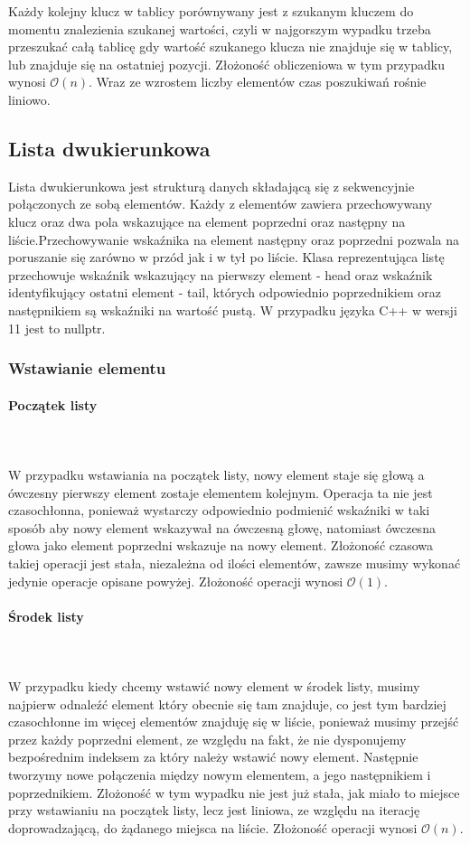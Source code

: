 \documentclass{article}
\newcommand{\myparagraph}[1]{\paragraph{#1}\mbox{}\\\\}
\begin{document}
Każdy kolejny klucz w tablicy porównywany jest z szukanym kluczem do momentu znalezienia szukanej wartości, czyli w najgorszym wypadku trzeba przeszukać całą tablicę gdy wartość szukanego klucza nie znajduje się w tablicy, lub znajduje się na ostatniej pozycji.
Złożoność obliczeniowa w tym przypadku wynosi $\mathcal{O}(n)$. Wraz ze wzrostem liczby elementów czas poszukiwań rośnie liniowo.


\subsection{Lista dwukierunkowa}
 
Lista dwukierunkowa jest strukturą danych składającą się z sekwencyjnie połączonych ze sobą elementów. Każdy z elementów zawiera przechowywany klucz oraz dwa pola wskazujące na element poprzedni oraz następny na liście.\linebreak Przechowywanie wskaźnika na element następny oraz poprzedni pozwala na poruszanie się zarówno w przód jak i w tył po liście. Klasa reprezentująca listę przechowuje wskaźnik wskazujący na pierwszy element - head oraz wskaźnik identyfikujący ostatni element - tail, których odpowiednio poprzednikiem oraz następnikiem są wskaźniki na wartość pustą. W przypadku języka C++ w wersji 11 jest to nullptr.

\subsubsection{Wstawianie elementu} 
 
\myparagraph{Początek listy}
W przypadku wstawiania na początek listy, nowy element staje się głową a ówczesny pierwszy element zostaje elementem kolejnym. Operacja ta nie jest czasochłonna, ponieważ wystarczy odpowiednio podmienić wskaźniki w taki sposób aby nowy element wskazywał na ówczesną głowę, natomiast ówczesna głowa jako element poprzedni wskazuje na nowy element. Złożoność czasowa takiej operacji jest stała, niezależna od ilości elementów, zawsze musimy wykonać jedynie operacje opisane powyżej. Złożoność operacji wynosi $\mathcal{O}(1)$.

\myparagraph{Środek listy} 
W przypadku kiedy chcemy wstawić nowy element w środek listy, musimy najpierw odnaleźć element który obecnie się tam znajduje, co jest tym bardziej czasochłonne im więcej elementów znajduję się w liście, ponieważ musimy przejść przez każdy poprzedni element, ze względu na fakt, że nie dysponujemy bezpośrednim indeksem za który należy wstawić nowy element. Następnie tworzymy nowe połączenia między nowym elementem, a jego następnikiem i poprzednikiem. 
Złożoność w tym wypadku nie jest już stała, jak miało to miejsce przy wstawianiu na początek listy, lecz jest liniowa, ze względu na iterację doprowadzającą, do żądanego miejsca na liście. Złożoność operacji wynosi $\mathcal{O}(n)$.
\end{document}
